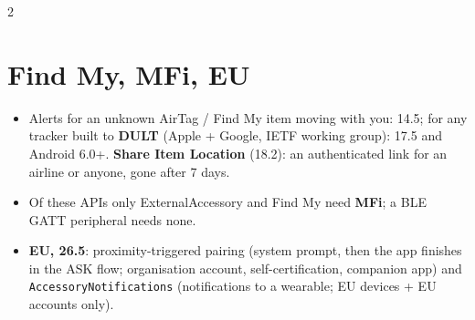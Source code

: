 \documentclass[8pt]{extarticle}
\newcommand\ct[1]{\texttt{#1}}
\begin{document}
\begin{multicols}{2}
\section{Find My, MFi, EU}
\begin{itemize}
  \item Alerts for an
        unknown AirTag / Find My item moving with you: 14.5; for any tracker built to \textbf{DULT}
        (Apple + Google, IETF working group): 17.5 and Android 6.0+. \textbf{Share Item Location}
        (18.2): an authenticated link for an airline or anyone, gone after 7 days.
  \item Of these APIs only ExternalAccessory and Find My need \textbf{MFi}; a BLE GATT peripheral needs none.
  \item \textbf{EU, 26.5}: proximity-triggered pairing (system prompt, then the app finishes in the
        ASK flow; organisation account, self-certification, companion app) and
        \ct{AccessoryNotifications} (notifications to a wearable; EU devices + EU accounts only).
\end{itemize}

\end{multicols}

\end{document}
